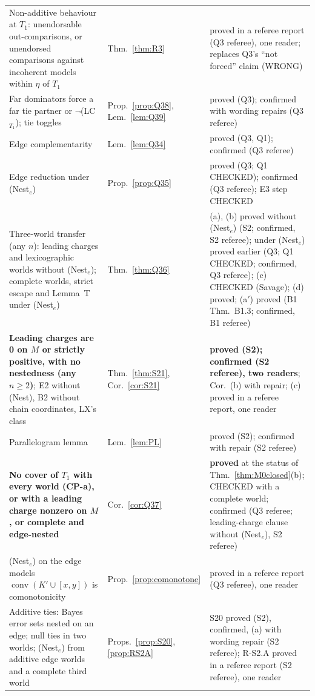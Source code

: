 \documentclass[11pt]{article}
\theoremstyle{definition}
\theoremstyle{remark}
\newcommand{\co}{\operatorname{conv}}
\begin{document}
{\begin{longtable}{>{\raggedright\arraybackslash}p{6.4cm}>{\raggedright\arraybackslash}p{2.1cm}>{\raggedright\arraybackslash}p{5.6cm}}
Non-additive behaviour at $T_1$: unendorsable out-comparisons, or unendorsed comparisons against incoherent models within $\eta$ of $T_1$ & Thm.~\ref{thm:R3} & proved in a referee report (Q3 referee), one reader; replaces Q3's ``not forced'' claim (WRONG)\\
Far dominators force a far tie partner or $\neg$(LC$_{T_1}$); tie toggles & Prop.~\ref{prop:Q38}, Lem.~\ref{lem:Q39} & proved (Q3); confirmed with wording repairs (Q3 referee)\\
Edge complementarity & Lem.~\ref{lem:Q34} & proved (Q3, Q1); confirmed (Q3 referee)\\
Edge reduction under (Nest$_e$) & Prop.~\ref{prop:Q35} & proved (Q3; Q1 CHECKED); confirmed (Q3 referee); E3 step CHECKED\\
Three-world transfer (any $n$): leading charges and lexicographic worlds without (Nest$_e$); complete worlds, strict escape and Lemma~T under (Nest$_e$) & Thm.~\ref{thm:Q36} & (a), (b) proved without (Nest$_e$) (S2; confirmed, S2 referee); under (Nest$_e$) proved earlier (Q3; Q1 CHECKED; confirmed, Q3 referee); (c) CHECKED (Savage); (d) proved; (a$'$) proved (B1 Thm.~B1.3; confirmed, B1 referee)\\
\textbf{Leading charges are 0 on $M$ or strictly positive, with no nestedness (any $n\ge2$)}; E2 without (Nest), B2 without chain coordinates, LX's class & Thm.~\ref{thm:S21}, Cor.~\ref{cor:S21} & \textbf{proved (S2); confirmed (S2 referee), two readers}; Cor.\ (b) with repair; (c) proved in a referee report, one reader\\
Parallelogram lemma & Lem.~\ref{lem:PL} & proved (S2); confirmed with repair (S2 referee)\\
\textbf{No cover of $T_1$ with every world (CP-a), or with a leading charge nonzero on $M$, or complete and edge-nested} & Cor.~\ref{cor:Q37} & \textbf{proved} at the status of Thm.~\ref{thm:M0closed}(b); CHECKED with a complete world; confirmed (Q3 referee; leading-charge clause without (Nest$_e$), S2 referee)\\
(Nest$_e$) on the edge models $\co(K'\cup[x,y])$ is comonotonicity & Prop.~\ref{prop:comonotone} & proved in a referee report (Q3 referee), one reader\\
Additive ties: Bayes error sets nested on an edge; null ties in two worlds; (Nest$_e$) from additive edge worlds and a complete third world & Props.~\ref{prop:S20}, \ref{prop:RS2A} & S20 proved (S2), confirmed, (a) with wording repair (S2 referee); R-S2.A proved in a referee report (S2 referee), one reader\\

\end{longtable}}
\end{document}
